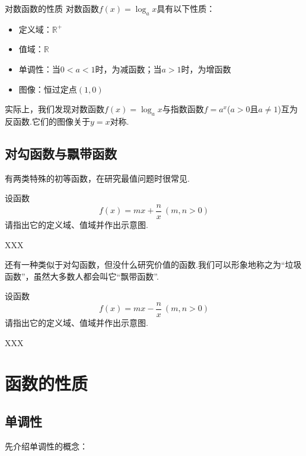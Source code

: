 \documentclass[lang=cn, zihao=5]{elegantbook}
\begin{document}
\begin{proposition}{对数函数的性质}
    对数函数$f(x)=\log_{a}{x}$具有以下性质：
    \begin{itemize}
        \item 定义域：$\mathbb{R}^{+}$
        \item 值域：$\mathbb{R}$
        \item 单调性：当$0<a<1$时，为减函数；当$a>1$时，为增函数
        \item 图像：恒过定点$(1,0)$
    \end{itemize}
\end{proposition}


实际上，我们发现对数函数$f(x)=\log_{a}{x}$与指数函数$f=a^{x}$($a>0$且$a \neq 1$)互为反函数.它们的图像关于$y=x$对称.

\subsection{对勾函数与飘带函数}

有两类特殊的初等函数，在研究最值问题时很常见.

\begin{problem}
    设函数$$f(x)=mx+\frac{n}{x}~(m,n>0)$$
    请指出它的定义域、值域并作出示意图.
\end{problem}
\begin{solution}
    XXX
\end{solution}

还有一种类似于对勾函数，但没什么研究价值的函数.我们可以形象地称之为“垃圾函数”，虽然大多数人都会叫它“飘带函数”.

\begin{problem}
    设函数$$f(x)=mx-\frac{n}{x}~(m,n>0)$$
    请指出它的定义域、值域并作出示意图.
\end{problem}
\begin{solution}
    XXX
\end{solution}

\section{函数的性质}

\subsection{单调性}

先介绍单调性的概念：
\end{document}
